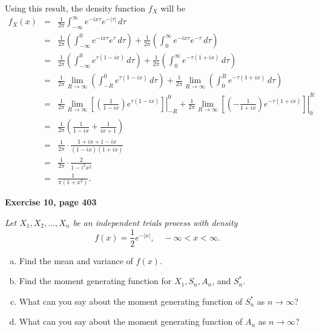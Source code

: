 \documentclass[12pt]{article}
\begin{document}
	Using this result, the density function $f_X$ will be
	\begin{eqnarray*}
	f_{X}{(x)} &=& \frac{1}{2\pi} \int_{-\infty}^{\infty} e^{-ix\tau} e^{-|\tau|}  \, d\tau \\
	&=& \frac{1}{2\pi} \left( \int_{-\infty}^{0}e^{-ix\tau} e^{\tau}\, d\tau \right) + \frac{1}{2\pi} \left( \int_{0}^{\infty}e^{-ix\tau} e^{-\tau}\, d\tau \right) \\ 
	&=& \frac{1}{2\pi} \left( \int_{-\infty}^{0}e^{\tau(1-ix)} \, d\tau \right) + \frac{1}{2\pi} \left( \int_{0}^{\infty}e^{-\tau(1+ix)} \, d\tau \right) \\ 
	&=& \frac{1}{2\pi} \lim_{R \rightarrow \infty} \left( \int_{-R}^{0} e^{\tau(1-ix)} \, d\tau \right) +  \frac{1}{2\pi} \lim_{R \rightarrow \infty} \left( \int_{0}^{R}   e^{-\tau(1+ix)} \, d\tau \right) \\ 
	&=& \frac{1}{2\pi} \lim_{R \rightarrow \infty} \left.\left[ \left( \frac{1}{1-ix}\right) e^{\tau(1-ix)} \right] \right|_{-R}^0 +  \frac{1}{2\pi} \lim_{R \rightarrow \infty} \left.\left[ \left( -\frac{1}{1+ix}\right) e^{-\tau(1+ix)} \right] \right|_{0}^R \\ 
	&=& \frac{1}{2\pi} \left( \frac{1}{1-ix} + \frac{1}{ix+1} \right) \\ 
	&=& \frac{1}{2\pi} \cdot \frac{1+ix+1-ix}{(1-ix)(1+ix)} \\ 
	&=& \frac{1}{2\pi} \cdot \frac{2}{1-i^2x^2}  \\ 
	&=& \frac{1}{\pi(1+x^2)}.
	\end{eqnarray*}
	
	
	{\bf Exercise 10, page 403}
	
	{\em Let $X_1, X_2, \ldots, X_n$ be an independent trials process with density
	\begin{equation*}
		f(x) = \frac{1}{2}e^{-|x|}, \quad -\infty < x < \infty.
	\end{equation*} \setlength{\parskip}{0cm}
	\begin{enumerate}[a)]
		\item Find the mean and variance of $f(x)$.
		\item Find the moment generating function for $X_1, S_n, A_n$, and $S_n^*$.
		\item What can you say about the moment generating function of $S_n^*$ as $n \rightarrow \infty$?
		\item What can you say about the moment generating function of $A_n$ as $n \rightarrow \infty$?
	\end{enumerate}
	}
	
	


\end{document}
